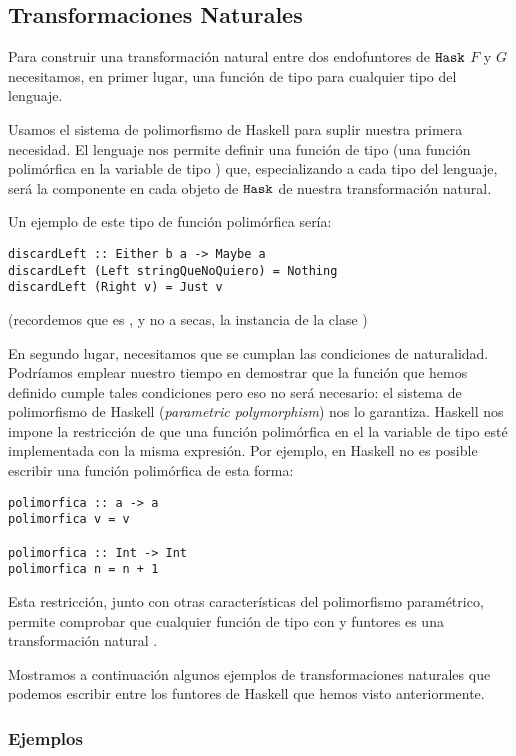 \subsection{Transformaciones Naturales}
Para construir una transformación natural entre dos endofuntores de
$\texttt{Hask}$ $F$ y $G$ necesitamos, en primer lugar, una función de tipo
 para  cualquier tipo del lenguaje.

Usamos el sistema de polimorfismo de Haskell para suplir nuestra primera
necesidad. El lenguaje nos permite definir una función de
tipo  (una función polimórfica en la variable de
tipo ) que, especializando a cada tipo del lenguaje, será
la componente en cada objeto de $\texttt{Hask}$ de nuestra transformación natural.

Un ejemplo de este tipo de función polimórfica sería:
\begin{verbatim}
discardLeft :: Either b a -> Maybe a
discardLeft (Left stringQueNoQuiero) = Nothing
discardLeft (Right v) = Just v
\end{verbatim}
(recordemos que es , y no  a secas,
la instancia de la clase )

En segundo lugar, necesitamos que se cumplan las condiciones de
naturalidad. Podríamos emplear nuestro tiempo en demostrar que
la función  que hemos definido cumple
tales condiciones pero eso no
será necesario: el sistema de polimorfismo de
Haskell (\textit{parametric polymorphism}) nos lo garantiza.
Haskell nos impone la restricción de que
una función polimórfica en el la variable de tipo 
esté implementada
con la misma expresión. Por ejemplo, en Haskell no es posible
escribir una función polimórfica de esta forma:
\begin{verbatim}
polimorfica :: a -> a
polimorfica v = v

polimorfica :: Int -> Int
polimorfica n = n + 1
\end{verbatim}
Esta restricción, junto con otras características
del polimorfismo paramétrico, permite comprobar que cualquier
función de tipo  con  y  funtores es
una transformación natural \cite{theorems-for-free}.

Mostramos a continuación algunos ejemplos de transformaciones naturales
que podemos escribir entre los funtores de Haskell que hemos visto
anteriormente.

\subsubsection{Ejemplos}
